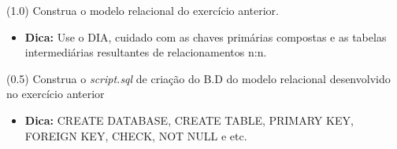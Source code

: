 \documentclass[12pt]{exam}
\begin{document}
\begin{questions}


\question (1.0) Construa o modelo relacional do exercício anterior.

\begin{itemize}
    \item \textbf{Dica:} Use o DIA, cuidado com as chaves primárias compostas e as tabelas intermediárias resultantes de relacionamentos n:n.
\end{itemize}


\question (0.5) Construa o \textit{script.sql} de criação do B.D do modelo relacional desenvolvido no exercício anterior 
\begin{itemize}
    \item \textbf{Dica:} CREATE DATABASE, CREATE TABLE, PRIMARY KEY, FOREIGN KEY, CHECK, NOT NULL e etc.
\end{itemize}



\end{questions}
\end{document}
